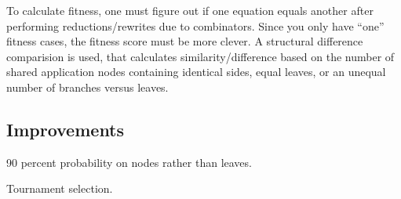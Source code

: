 \documentclass{article}
\begin{document}
To calculate fitness, one must figure out if one equation equals
another after performing reductions/rewrites due to combinators. Since
you only have ``one'' fitness cases, the fitness score must be more
clever. A structural difference comparision is used, that calculates
similarity/difference based on the number of shared application nodes
containing identical sides, equal leaves, or an unequal number of
branches versus leaves.

\subsection{Improvements}

90 percent probability on nodes rather than leaves.

Tournament selection.
\end{document}

